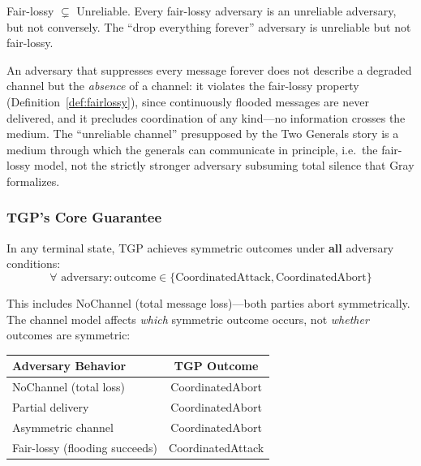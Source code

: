 \begin{proposition}
\label{prop:strict}
Fair-lossy $\subsetneq$ Unreliable. Every fair-lossy adversary is an unreliable adversary, but not conversely. The ``drop everything forever'' adversary is unreliable but not fair-lossy.
\end{proposition}

\begin{proposition}
\label{prop:nondegen}
An adversary that suppresses every message forever does not describe a degraded channel but the \emph{absence} of a channel: it violates the fair-lossy property (Definition~\ref{def:fairlossy}), since continuously flooded messages are never delivered, and it precludes coordination of any kind---no information crosses the medium. The ``unreliable channel'' presupposed by the Two Generals story is a medium through which the generals can communicate in principle, i.e.\ the fair-lossy model, not the strictly stronger adversary subsuming total silence that Gray formalizes.
\end{proposition}

\subsubsection{TGP's Core Guarantee}

\begin{theorem}
\label{thm:universal-symmetry}
In any terminal state, TGP achieves symmetric outcomes under \textbf{all} adversary conditions:
\[
\forall \text{ adversary}: \text{outcome} \in \{\text{CoordinatedAttack}, \text{CoordinatedAbort}\}
\]
\end{theorem}

This includes NoChannel (total message loss)---both parties abort symmetrically. The channel model affects \emph{which} symmetric outcome occurs, not \emph{whether} outcomes are symmetric:

\begin{center}
\begin{tabular}{lc}
\toprule
\textbf{Adversary Behavior} & \textbf{TGP Outcome} \\
\midrule
NoChannel (total loss) & CoordinatedAbort \\
Partial delivery & CoordinatedAbort \\
Asymmetric channel & CoordinatedAbort \\
Fair-lossy (flooding succeeds) & CoordinatedAttack \\
\bottomrule
\end{tabular}
\end{center}

